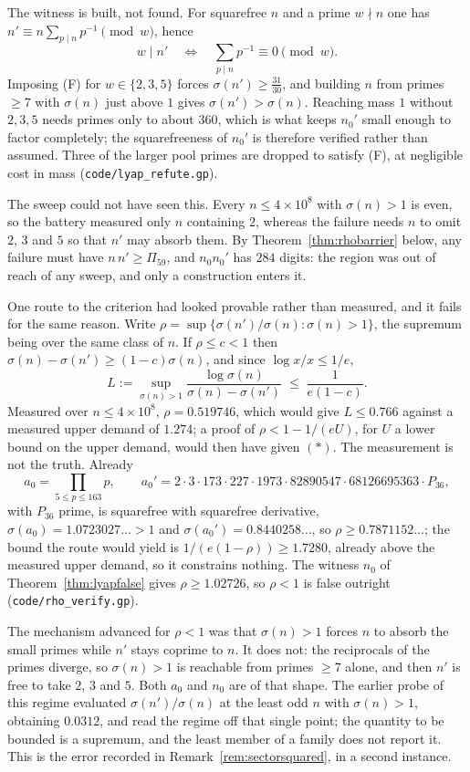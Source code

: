 \documentclass[11pt]{article}
\theoremstyle{definition}
\begin{document}
The witness is built, not found. For squarefree $n$ and a prime $w\nmid n$ one has
$n'\equiv n\sum_{p\mid n}p^{-1}\pmod w$, hence
\[ w\mid n'\quad\Longleftrightarrow\quad \sum_{p\mid n}p^{-1}\equiv0 \pmod w. \tag{F} \]
Imposing (F) for $w\in\{2,3,5\}$ forces $\sigma(n')\ge\tfrac{31}{30}$, and building $n$ from primes
$\ge7$ with $\sigma(n)$ just above $1$ gives $\sigma(n')>\sigma(n)$. Reaching mass $1$ without
$2,3,5$ needs primes only to about $360$, which is what keeps $n_0'$ small enough to factor
completely; the squarefreeness of $n_0'$ is therefore verified rather than assumed. Three of the
larger pool primes are dropped to satisfy (F), at negligible cost in mass
\textup{(\texttt{code/lyap\_refute.gp})}.

The sweep could not have seen this. Every $n\le4\times10^8$ with $\sigma(n)>1$ is even, so the
battery measured only $n$ containing $2$, whereas the failure needs $n$ to omit $2$, $3$ and $5$ so
that $n'$ may absorb them. By Theorem~\ref{thm:rhobarrier} below, any failure must have
$n\,n'\ge\Pi_{59}$, and $n_0n_0'$ has $284$ digits: the region was out of reach of any sweep, and
only a construction enters it.

One route to the criterion had looked provable rather than measured, and it fails for the same
reason. Write $\rho=\sup\{\sigma(n')/\sigma(n):\sigma(n)>1\}$, the supremum being over the same
class of $n$. If $\rho\le c<1$ then $\sigma(n)-\sigma(n')\ge(1-c)\sigma(n)$, and since
$\log x/x\le1/e$,
\[ L:=\sup_{\sigma(n)>1}\frac{\log\sigma(n)}{\sigma(n)-\sigma(n')}\;\le\;\frac1{e(1-c)} . \]
Measured over $n\le4\times10^8$, $\rho=0.519746$, which would give $L\le0.766$ against a measured
upper demand of $1.274$; a proof of $\rho<1-1/(eU)$, for $U$ a lower bound on the upper demand,
would then have given $(\ast)$. The measurement is not the truth. Already
\[ a_0=\!\!\prod_{5\le p\le163}\!\!p,\qquad
   a_0'=2\cdot3\cdot173\cdot227\cdot1973\cdot82890547\cdot68126695363\cdot P_{36}, \]
with $P_{36}$ prime, is squarefree with squarefree derivative, $\sigma(a_0)=1.0723027\ldots>1$ and
$\sigma(a_0')=0.8440258\ldots$, so $\rho\ge0.7871152\ldots$; the bound the route would yield is
$1/(e(1-\rho))\ge1.7280$, already above the measured upper demand, so it constrains nothing. The
witness $n_0$ of Theorem~\ref{thm:lyapfalse} gives $\rho\ge1.02726$, so $\rho<1$ is false outright
\textup{(\texttt{code/rho\_verify.gp})}.

The mechanism advanced for $\rho<1$ was that $\sigma(n)>1$ forces $n$ to absorb the small primes
while $n'$ stays coprime to $n$. It does not: the reciprocals of the primes diverge, so $\sigma(n)>1$
is reachable from primes $\ge7$ alone, and then $n'$ is free to take $2$, $3$ and $5$. Both $a_0$ and
$n_0$ are of that shape. The earlier probe of this regime evaluated $\sigma(n')/\sigma(n)$ at the
least odd $n$ with $\sigma(n)>1$, obtaining $0.0312$, and read the regime off that single point;
the quantity to be bounded is a supremum, and the least member of a family does not report it. This
is the error recorded in Remark~\ref{rem:sectorsquared}, in a second instance.
\end{document}
